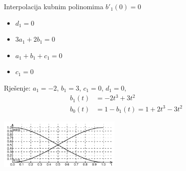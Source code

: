 \documentclass[9pt]{beamer}
\begin{document}
\begin{frame}{Interpolacija kubnim polinomima}
	$b'_1(0)=0$ \\
	\begin{itemize}
		\item $d_1=0$
		\item $3a_1+2b_1 = 0$
		\item $a_1+b_1 + c_1 = 0$
		\item $c_1=0$
	\end{itemize}
	Rješenje: $a_1=-2$, $b_1=3$, $c_1=0$, $d_1=0$,
	\begin{align*}
		b_1(t) &= -2t^3 + 3t^2 \\
		b_0(t) &= 1-b_1(t) = 1+2t^3 - 3t^2
	\end{align*}
\begin{center}
	\includegraphics[height=2.5cm]{./slike/lin_interp_der_eq_0.png}
\end{center}
\end{frame}
\end{document}
